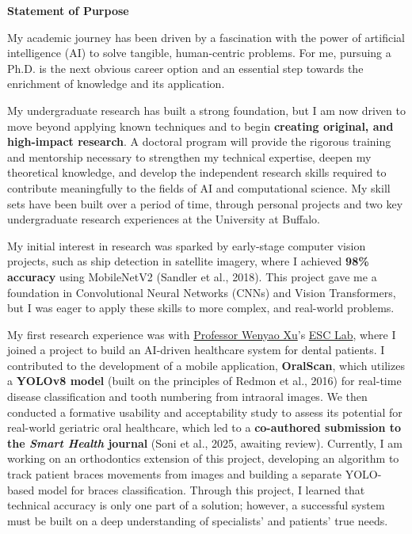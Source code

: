 \documentclass[12pt, letterpaper]{article}
\begin{document}
\centerline{\Large\textbf{Statement of Purpose}}
\vspace{1em} %


My academic journey has been driven by a fascination with the power of artificial intelligence (AI) to solve tangible, human-centric problems. For me, pursuing a Ph.D. is the next obvious career option and an essential step towards the enrichment of knowledge and its application.

My undergraduate research has built a strong foundation, but I am now driven to move beyond applying known techniques and to begin \textbf{creating original, and high-impact research}. A doctoral program will provide the rigorous training and mentorship necessary to strengthen my technical expertise, deepen my theoretical knowledge, and develop the independent research skills required to contribute meaningfully to the fields of AI and computational science. My skill sets have been built over a period of time, through personal projects and two key undergraduate research experiences at the University at Buffalo.

My initial interest in research was sparked by early-stage computer vision projects, such as ship detection in satellite imagery, where I achieved \textbf{98\% accuracy} using MobileNetV2 (Sandler et al., 2018). This project gave me a foundation in Convolutional Neural Networks (CNNs) and Vision Transformers, but I was eager to apply these skills to more complex, and real-world problems.

My first research experience was with \href{https://cse.buffalo.edu/~wenyaoxu/index.html}{Professor Wenyao Xu}’s \href{https://cse.buffalo.edu/~wenyaoxu/esc.html}{ESC Lab}, where I joined a project to build an AI-driven healthcare system for dental patients. I contributed to the development of a mobile application, \textbf{OralScan}, which utilizes a \textbf{YOLOv8 model} (built on the principles of Redmon et al., 2016) for real-time disease classification and tooth numbering from intraoral images. We then conducted a formative usability and acceptability study to assess its potential for real-world geriatric oral healthcare, which led to a \textbf{co-authored submission to the \textit{Smart Health} journal} (Soni et al., 2025, awaiting review). Currently, I am working on an orthodontics extension of this project, developing an algorithm to track patient braces movements from images and building a separate YOLO-based model for braces classification. Through this project, I learned that technical accuracy is only one part of a solution; however, a successful system must be built on a deep understanding of specialists’ and patients’ true needs.
\end{document}
